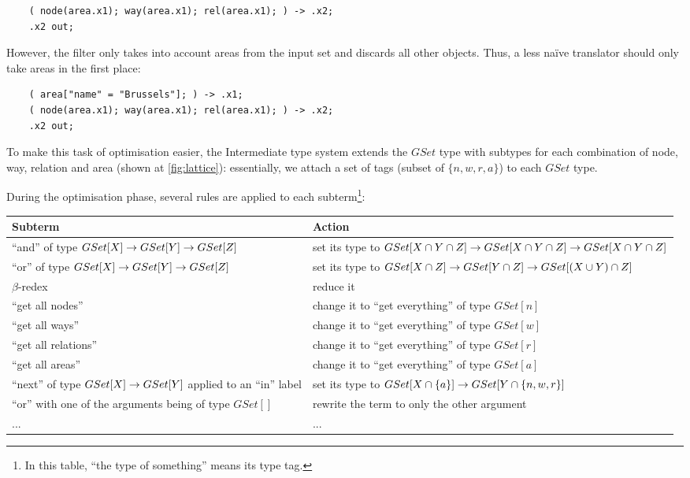 \documentclass[main.tex]{subfiles}
\begin{document}
\begin{example}
\begin{lstwrap}
\begin{lstlisting}
    ( node(area.x1); way(area.x1); rel(area.x1); ) -> .x2;
    .x2 out;
\end{lstlisting}\end{lstwrap}
However, the  filter only takes into account areas from the
input set and discards all other objects. Thus, a less naïve translator should
only take areas in the first place:
\begin{lstwrap}\begin{lstlisting}
    ( area["name" = "Brussels"]; ) -> .x1;
    ( node(area.x1); way(area.x1); rel(area.x1); ) -> .x2;
    .x2 out;
\end{lstlisting}\end{lstwrap}
\end{example}

To make this task of optimisation easier, the Intermediate type system extends the $GSet$
type with subtypes for each combination of node, way, relation and area
(shown at \cref{fig:lattice}): essentially, we attach a set of tags (subset
of $\{ n, w, r, a \}$) to each $GSet$ type.

During the optimisation phase, several rules are applied to each subterm\footnote{
    In this table, ``the type of something'' means its type tag.
}:
\begin{center}
\begin{tabular}{|p{}|p{}|}
    \hline
    Subterm & Action \\
    \hline
    ``and'' of type $GSet[X] \rightarrow GSet[Y] \rightarrow GSet[Z]$
        & set its type to $GSet[X \cap Y \cap Z] \rightarrow GSet[X \cap Y \cap Z] \rightarrow GSet[X \cap Y \cap Z]$ \\
    \hline
    ``or'' of type $GSet[X] \rightarrow GSet[Y] \rightarrow GSet[Z]$
        & set its type to $GSet[X \cap Z] \rightarrow GSet[Y \cap Z] \rightarrow GSet[(X \cup Y) \cap Z]$ \\
    \hline
    $\beta$-redex & reduce it \\
    \hline
    ``get all nodes'' & change it to ``get everything'' of type $GSet[n]$ \\
    ``get all ways'' & change it to ``get everything'' of type $GSet[w]$ \\
    ``get all relations'' & change it to ``get everything'' of type $GSet[r]$ \\
    ``get all areas'' & change it to ``get everything'' of type $GSet[a]$ \\
    \hline
    ``next'' of type $GSet[X] \rightarrow GSet[Y]$ applied to an ``in'' label
        & set its type to $GSet[X \cap \{ a \}] \rightarrow GSet[Y \cap \{ n, w, r \}]$ \\
    \hline
    ``or'' with one of the arguments being of type $GSet[]$
        & rewrite the term to only the other argument \\
    \hline
    ... & ... \\
    \hline
\end{tabular}
\end{center}
\end{document}
